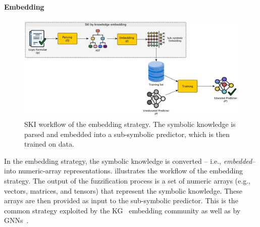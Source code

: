 \paragraph{Embedding}\label{par:ski-embedding}
%
\begin{figure}
    \centering
    \includegraphics[width=.9\linewidth]{figures/workflow-embedding}
    \caption[SKI workflow of embedding strategy]{
        \gls{SKI} workflow of the embedding strategy.
        The symbolic knowledge is parsed and embedded into a sub-symbolic predictor, which is then trained on data.
    }
    \label{fig:workflow-embedding}
\end{figure}
%
In the embedding strategy, the symbolic knowledge is converted -- i.e., \emph{embedded}-- into numeric-array representations.
%
 illustrates the workflow of the embedding strategy.
%
The output of the fuzzification process is a set of numeric arrays (e.g., vectors, matrices, and tensors) that represent the symbolic knowledge.
%
These arrays are then provided as input to the sub-symbolic predictor.
%
This is the common strategy exploited by the \gls{KG}~\cite{DBLP:conf/ijcai/LambGGPAV20} embedding community as well as by \glspl{GNN}~\cite{DBLP:journals/tkde/WangMWG17}.


